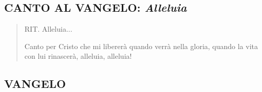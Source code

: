 
\subsection*{CANTO AL VANGELO: \textit{Alleluia}}

\begin{verse}
\begin{mystrofe}
RIT. Alleluia...
\end{mystrofe}

\begin{mystrofe}
Canto per Cristo che mi libererà quando verrà nella gloria, quando la vita con lui rinascerà, alleluia, alleluia!
\end{mystrofe}

\end{verse}

\subsection*{VANGELO}

